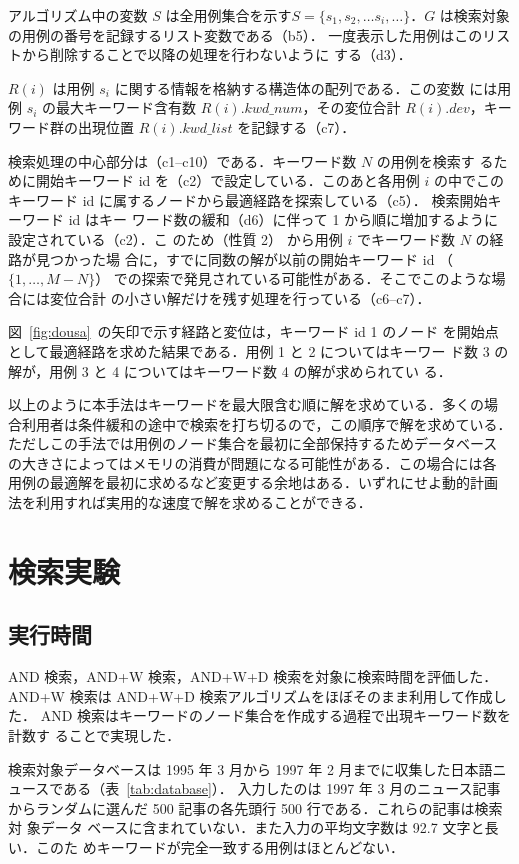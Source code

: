 アルゴリズム中の変数 $S$ は全用例集合を示す$S = \{s_1, s_2,\ldots s_i, \ldots\}$．$G$ は検索対象の用例の番号を記録するリスト変数である（b5）．
一度表示した用例はこのリストから削除することで以降の処理を行わないように
する（d3）． 

$R(i)$ は用例 $s_i$ に関する情報を格納する構造体の配列である．この変数
には用例 $s_i$ の最大キーワード含有数 
$R(i).kwd\_num$，その変位合計 $R(i).dev$，キーワード群の出現位置 
$R(i).kwd\_list$ を記録する（c7）．

検索処理の中心部分は（c1--c10）である．キーワード数 $N$ の用例を検索す
るために開始キーワード id を（c2）で設定している．このあと各用例 $i$ 
の中でこのキーワード id に属するノードから最適経路を探索している（c5）．
検索開始キーワード id はキー
ワード数の緩和（d6）に伴って 1 から順に増加するように設定されている（c2）．こ
のため（性質 2） から用例 $i$ でキーワード数 $N$ の経路が見つかった場
合に，すでに同数の解が以前の開始キーワード id （$\{1, \ldots, M-N\}$）
での探索で発見されている可能性がある．そこでこのような場合には変位合計
の小さい解だけを残す処理を行っている（c6--c7）．

図~\ref{fig:dousa}~の矢印で示す経路と変位は，キーワード id 1 のノード
を開始点として最適経路を求めた結果である．用例 1 と 2 についてはキーワー
ド数 3 の解が，用例 3 と 4 についてはキーワード数 4 の解が求められてい
る．

以上のように本手法はキーワードを最大限含む順に解を求めている．多くの場
合利用者は条件緩和の途中で検索を打ち切るので，この順序で解を求めている．
ただしこの手法では用例のノード集合を最初に全部保持するためデータベース
の大きさによってはメモリの消費が問題になる可能性がある．この場合には各
用例の最適解を最初に求めるなど変更する余地はある．いずれにせよ動的計画
法を利用すれば実用的な速度で解を求めることができる．
\section{検索実験}
\label{sec:jikken}
\subsection{実行時間}
\label{sec:jikan}
AND 検索，AND+W 検索，AND+W+D 検索を対象に検索時間を評価した．
AND+W 検索は AND+W+D 検索アルゴリズムをほぼそのまま利用して作成した．
AND 検索はキーワードのノード集合を作成する過程で出現キーワード数を計数す
ることで実現した．

検索対象データベースは 1995 年 3 月から 1997 年 2 月までに収集した日本語ニュースである（表~\ref{tab:database}）．
入力したのは 1997 年 
3 月のニュース記事からランダムに選んだ 500 記事の各先頭行 500 行である．これらの記事は検索対
象データ
ベースに含まれていない．また入力の平均文字数は 92.7 文字と長い．このた
めキーワードが完全一致する用例はほとんどない．

